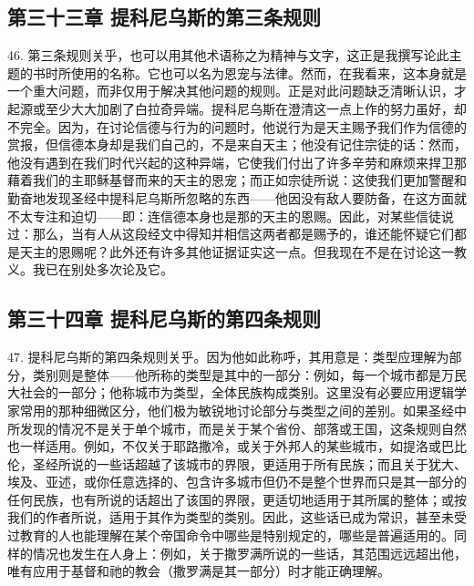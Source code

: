 
\subsection{第三十三章 提科尼乌斯的第三条规则}

46. 第三条规则关乎，也可以用其他术语称之为精神与文字，这正是我撰写论此主题的书时所使用的名称。它也可以名为恩宠与法律。然而，在我看来，这本身就是一个重大问题，而非仅用于解决其他问题的规则。正是对此问题缺乏清晰认识，才起源或至少大大加剧了白拉奇异端。提科尼乌斯在澄清这一点上作的努力虽好，却不完全。因为，在讨论信德与行为的问题时，他说行为是天主赐予我们作为信德的赏报，但信德本身却是我们自己的，不是来自天主；他没有记住宗徒的话：然而，他没有遇到在我们时代兴起的这种异端，它使我们付出了许多辛劳和麻烦来捍卫那藉着我们的主耶稣基督而来的天主的恩宠；而正如宗徒所说：这使我们更加警醒和勤奋地发现圣经中提科尼乌斯所忽略的东西——他因没有敌人要防备，在这方面就不太专注和迫切——即：连信德本身也是那的天主的恩赐。因此，对某些信徒说过：那么，当有人从这段经文中得知并相信这两者都是赐予的，谁还能怀疑它们都是天主的恩赐呢？此外还有许多其他证据证实这一点。但我现在不是在讨论这一教义。我已在别处多次论及它。\par


\subsection{第三十四章 提科尼乌斯的第四条规则}

47. 提科尼乌斯的第四条规则关乎。因为他如此称呼，其用意是：类型应理解为部分，类别则是整体——他所称的类型是其中的一部分：例如，每一个城市都是万民大社会的一部分；他称城市为类型，全体民族构成类别。这里没有必要应用逻辑学家常用的那种细微区分，他们极为敏锐地讨论部分与类型之间的差别。如果圣经中所发现的情况不是关于单个城市，而是关于某个省份、部落或王国，这条规则自然也一样适用。例如，不仅关于耶路撒冷，或关于外邦人的某些城市，如提洛或巴比伦，圣经所说的一些话超越了该城市的界限，更适用于所有民族；而且关于犹大、埃及、亚述，或你任意选择的、包含许多城市但仍不是整个世界而只是其一部分的任何民族，也有所说的话超出了该国的界限，更适切地适用于其所属的整体；或按我们的作者所说，适用于其作为类型的类别。因此，这些话已成为常识，甚至未受过教育的人也能理解在某个帝国命令中哪些是特别规定的，哪些是普遍适用的。同样的情况也发生在人身上：例如，关于撒罗满所说的一些话，其范围远远超出他，唯有应用于基督和祂的教会（撒罗满是其一部分）时才能正确理解。\par

